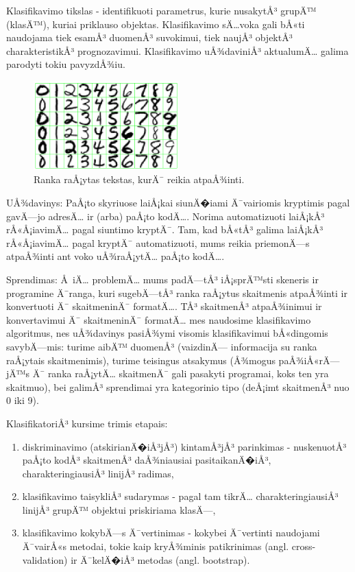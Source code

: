 Klasifikavimo tikslas - identifikuoti parametrus, kurie nusakytÅ³ grupÄ™ (klasÄ™),
kuriai priklauso objektas. Klasifikavimo sÄ…voka gali bÅ«ti naudojama tiek esamÅ³
duomenÅ³ suvokimui, tiek naujÅ³ objektÅ³ charakteristikÅ³ prognozavimui.
Klasifikavimo uÅ¾daviniÅ³ aktualumÄ… galima parodyti tokiu pavyzdÅ¾iu.

\begin{figure}[htb]
\begin{center}
\leavevmode
\includegraphics[width=0.5\textwidth]{images/ranka_rasyti_skaiciai.png}
\end{center}
\caption{Ranka raÅ¡ytas tekstas, kurÄ¯ reikia atpaÅ¾inti.}
\label{fig:flash}
\end{figure}

UÅ¾davinys: PaÅ¡to skyriuose laiÅ¡kai siunÄ�iami Ä¯vairiomis kryptimis pagal gavÄ—jo
adresÄ… ir (arba) paÅ¡to kodÄ…. Norima automatizuoti laiÅ¡kÅ³ rÅ«Å¡iavimÄ… pagal
siuntimo kryptÄ¯. Tam, kad bÅ«tÅ³ galima laiÅ¡kÅ³ rÅ«Å¡iavimÄ… pagal kryptÄ¯
automatizuoti, mums reikia priemonÄ—s atpaÅ¾inti ant voko uÅ¾raÅ¡ytÄ…
paÅ¡to kodÄ….

Sprendimas: Å iÄ… problemÄ… mums padÄ—tÅ³ iÅ¡sprÄ™sti skeneris ir programine Ä¯ranga,
kuri sugebÄ—tÅ³ ranka raÅ¡ytus skaitmenis atpaÅ¾inti ir konvertuoti Ä¯ skaitmeninÄ¯
formatÄ…. TÅ³ skaitmenÅ³ atpaÅ¾inimui ir konvertavimui Ä¯ skaitmeninÄ¯ formatÄ…
mes naudosime klasifikavimo algoritmus, nes uÅ¾davinys pasiÅ¾ymi
visomis klasifikavimui bÅ«dingomis savybÄ—mis: turime aibÄ™ duomenÅ³ (vaizdinÄ—
informacija su ranka raÅ¡ytais skaitmenimis), turime teisingus atsakymus (Å¾mogus
paÅ¾iÅ«rÄ—jÄ™s Ä¯ ranka raÅ¡ytÄ… skaitmenÄ¯ gali pasakyti programai, koks ten yra
skaitmuo), bei galimÅ³ sprendimai yra kategorinio tipo (deÅ¡imt skaitmenÅ³ nuo
0 iki 9).

KlasifikatoriÅ³ kursime trimis etapais:
\begin{enumerate}
  \item diskriminavimo (atskirianÄ�iÅ³jÅ³) kintamÅ³jÅ³ parinkimas - nuskenuotÅ³
  paÅ¡to kodÅ³ skaitmenÅ³ daÅ¾niausiai pasitaikanÄ�iÅ³, charakteringiausiÅ³ linijÅ³
  radimas,
  \item klasifikavimo taisykliÅ³ sudarymas - pagal tam tikrÄ… charakteringiausiÅ³
  linijÅ³ grupÄ™ objektui priskiriama klasÄ—,
  \item klasifikavimo kokybÄ—s Ä¯vertinimas - kokybei Ä¯vertinti naudojami Ä¯vairÅ«s
  metodai, tokie kaip kryÅ¾minis patikrinimas (angl. cross-validation) ir
  Ä¯kelÄ�iÅ³ metodas (angl. bootstrap).
\end{enumerate}

